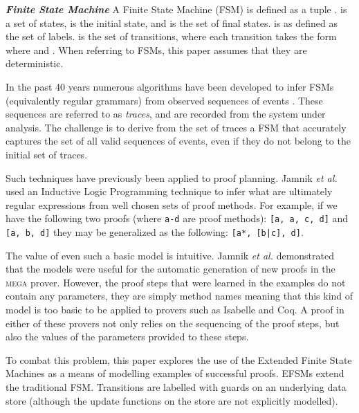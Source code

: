 \documentclass{llncs}
\begin{document}
\begin{definition}\textbf{\emph{Finite State Machine}}
\label{def:fsm}
 A Finite State Machine (FSM) is defined as a tuple .  is a set of states,  is the initial state, and  is the set of final states.  is as defined as the set of labels.  is the set of transitions, where each transition takes the form  where  and . When referring to FSMs, this paper assumes that they are deterministic.
\end{definition}

In the past 40 years numerous algorithms have been developed to infer FSMs (equivalently regular grammars) from observed sequences of events \cite{Biermann72,Lang98,WalkinshawStam13}. These sequences are referred to as \emph{traces}, and are recorded from the system under analysis. The challenge is to derive from the set of traces a FSM that accurately captures the set of all valid sequences of events, even if they do not belong to the initial set of traces.

Such techniques have previously been applied to proof planning. Jamnik \emph{et al.} \cite{Jamnik03} used an Inductive Logic Programming technique to infer what are ultimately regular expressions from well chosen sets of proof methods. For example, if we have the following two proofs (where \texttt{a-d} are proof methods): \texttt{[a, a, c, d]} and \texttt{[a, b, d]} they may be generalized as the following: \texttt{[a*, [b|c], d]}.  

The value of even such a basic model is intuitive. Jamnik \emph{et al.} demonstrated that the models were useful for the automatic generation of new proofs in the \textsc{mega} prover. However, the proof steps that were learned in the examples do not contain any parameters, they are simply method names meaning that this kind of model is too basic to be applied to provers such as Isabelle and Coq. A proof in either of these provers not only relies on the sequencing of the proof steps, but also the values of the parameters provided to these steps.

To combat this problem, this paper explores the use of the Extended Finite State Machines \cite{Cheng93} as a means of modelling examples of successful proofs. EFSMs extend the traditional FSM. Transitions are labelled with guards on an underlying data store (although the update functions on the store are not explicitly modelled).
\end{document}
